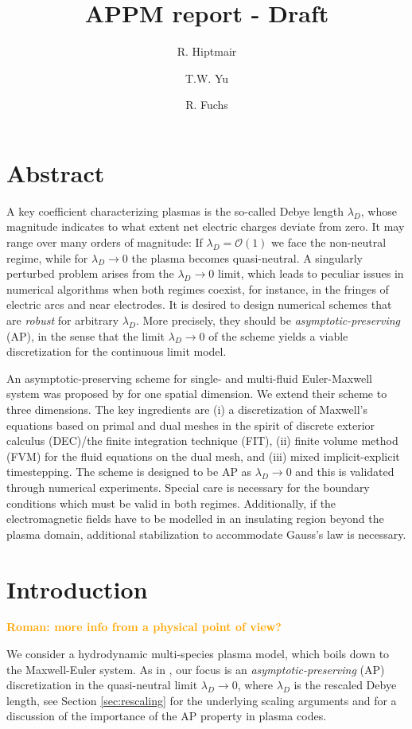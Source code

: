 \documentclass{article}
\title{APPM report - Draft}
\author[1]{R. Hiptmair}
\author[1]{T.W. Yu}
\author[2]{R. Fuchs}
\affil[1]{Seminar for Applied Mathematics , ETH Z\"{u}rich}
\affil[2]{IET Institut für Energietechnik, OST}
\date{}
\newcommand{\mycomment}[1]{\textcolor{orange}{\textsf{\textbf{#1}}}}
\begin{document}
\maketitle

\section*{Abstract}
A key coefficient characterizing plasmas is the so-called Debye length $\lambda_D$, whose magnitude indicates to what extent net electric charges deviate from zero. It may range over many orders of magnitude: If $\lambda_D = \mathcal{O}(1)$ we face the non-neutral regime, while for $\lambda_D\to 0$ the plasma becomes quasi-neutral. A singularly perturbed problem arises from the $\lambda_D\to 0$ limit, which leads to peculiar issues in numerical algorithms when both regimes coexist, for instance, in the fringes of electric arcs and near electrodes. It is desired to design numerical schemes that are \emph{robust} for arbitrary $\lambda_D$. More precisely, they should be \emph{asymptotic-preserving} (AP), in the sense that the limit $\lambda_D\to 0$ of the scheme yields a viable discretization for the continuous limit model.

An asymptotic-preserving scheme for single- and multi-fluid Euler-Maxwell system was proposed by \cite{degond_2012} for one spatial dimension. We extend their scheme to three dimensions. The key ingredients are (i) a discretization of Maxwell's equations based on primal and dual meshes in the spirit of discrete exterior calculus (DEC)/the finite integration technique (FIT), (ii) finite volume method (FVM) for the fluid equations on the dual mesh, and (iii) mixed implicit-explicit timestepping. The scheme is designed to be AP as $\lambda_D \rightarrow 0$ and this is validated through numerical experiments. Special care is necessary for the boundary conditions which must be valid in both regimes. Additionally, if the electromagnetic fields have to be modelled in an insulating region beyond the plasma domain, additional stabilization to accommodate Gauss's law is necessary.

\section{Introduction}

\mycomment{Roman: more info from a physical point of view?}

We consider a hydrodynamic multi-species plasma model, which boils down to the Maxwell-Euler system. As in \cite{degond_2012}, our focus is an \emph{asymptotic-preserving} (AP) discretization in the quasi-neutral limit $\lambda_D \rightarrow 0$, where $\lambda_D$ is the rescaled Debye length, see Section \ref{sec:rescaling} for the underlying scaling arguments and \cite{degond_2012,degond_2017} for a discussion of the importance of the AP property in plasma codes.  
\end{document}
